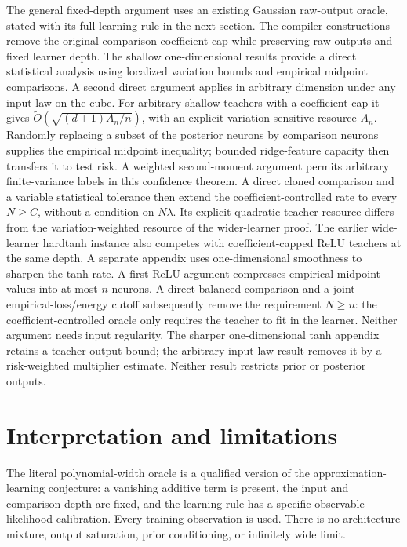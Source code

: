 \documentclass[11pt]{article}
\theoremstyle{remark}\newtheorem{remark}[theorem]{Remark}
\begin{document}
The general fixed-depth argument uses an existing Gaussian raw-output
oracle, stated with its full learning rule in the next section.
The compiler constructions remove the original comparison coefficient
cap while preserving raw outputs and fixed learner depth. The shallow
one-dimensional results provide a direct statistical analysis using
localized variation bounds and empirical midpoint comparisons.
A second direct argument applies in arbitrary dimension under any
input law on the cube. For arbitrary shallow teachers with a coefficient cap it gives
$\widetilde O(\sqrt{(d+1)A_n/n})$, with an explicit variation-sensitive
resource $A_n$. Randomly replacing a subset of the posterior neurons
by comparison neurons supplies the empirical midpoint inequality;
bounded ridge-feature capacity then transfers it to test risk.
A weighted second-moment argument permits arbitrary finite-variance
labels in this confidence theorem.
A direct cloned comparison and a variable statistical tolerance then
extend the coefficient-controlled rate to every $N\ge C$, without
a condition on $N\lambda$. Its explicit quadratic teacher resource
differs from the variation-weighted resource of the wider-learner proof.
The earlier wide-learner hardtanh instance also competes with
coefficient-capped ReLU teachers at the same depth. A separate appendix uses one-dimensional smoothness to
sharpen the tanh rate. A first ReLU argument compresses empirical midpoint values into at
most $n$ neurons. A direct balanced comparison and a joint
empirical-loss/energy cutoff subsequently remove the requirement
$N\ge n$: the coefficient-controlled oracle only requires the teacher
to fit in the learner. Neither argument needs input regularity.
The sharper one-dimensional tanh appendix retains a teacher-output
bound; the arbitrary-input-law result removes it by a risk-weighted
multiplier estimate. Neither result restricts prior or posterior outputs.






















\section{Interpretation and limitations}
The literal polynomial-width oracle is a qualified version of the
approximation-learning conjecture: a vanishing additive term is present,
the input and comparison depth are fixed, and the learning rule has a
specific observable likelihood calibration. Every training observation
is used. There is no architecture mixture, output saturation, prior
conditioning, or infinitely wide limit.
\end{document}
